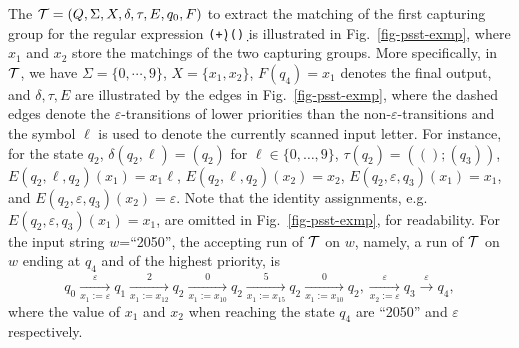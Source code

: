 \begin{example}
The \PSST $\mathcal{T}=(Q, \Sigma, X, \delta, \tau, E,  q_{0}, F)$ to extract the matching of the first capturing group for the regular expression \texttt{(\d+)(\d*)} 
%
is illustrated in Fig.~\ref{fig-psst-exmp}, where $x_1$ and $x_2$ store the matchings of the two capturing groups. More specifically, in $\mathcal{T}$, we have $\Sigma = \{0,\cdots,9\}$, $X= \{x_1,x_2\}$, $F(q_{4}) = x_1$ denotes the final output, and $\delta, \tau, E$ are illustrated by the edges in Fig.~\ref{fig-psst-exmp}, where the dashed edges denote the $\varepsilon$-transitions of lower priorities than the non-$\varepsilon$-transitions and the symbol $\ell$ is used to denote the currently scanned input letter. For instance, for the state $q_2$, $\delta(q_2, \ell) = (q_2)$ for $\ell \in \{0,\ldots, 9\}$, $\tau(q_2) = (();(q_3))$, $E(q_2, \ell, q_2)(x_1) = x_1 \ell$, $E(q_2, \ell, q_2)(x_2) = x_2$,  $E(q_2, \varepsilon, q_3)(x_1) = x_1$, and $E(q_2, \varepsilon, q_3)(x_2) = \varepsilon$. Note that the identity assignments, e.g. $E(q_2, \varepsilon, q_3)(x_1) = x_1$, are omitted in Fig.~\ref{fig-psst-exmp}, for readability.  For the input string $w$=``2050'', the accepting run of $\mathcal{T}$ on $w$, namely, a run of $\mathcal{T}$ on $w$ ending at $q_4$ and of the highest priority, is 
\[
q_0 \xrightarrow[x_1:=\varepsilon]{\varepsilon} q_1 \xrightarrow[x_1:=x_12]{2} q_2  \xrightarrow[x_1:=x_10]{0} q_2  \xrightarrow[x_1:=x_15]{5} q_2  \xrightarrow[x_1:=x_10]{0} q_2,  \xrightarrow[x_2:=\varepsilon]{\varepsilon} q_3  \xrightarrow{\varepsilon} q_4,
\]
where the value of $x_1$ and $x_2$ when reaching the state $q_4$ are ``2050'' and $\varepsilon$ respectively. 

\begin{figure}[ht]


\end{figure}
\end{example}
